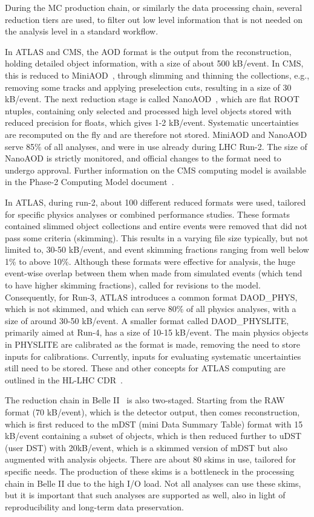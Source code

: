 \documentclass[a4paper,11pt]{article}
\begin{document}
During the MC production chain, or similarly the data processing chain,
several reduction tiers are used, to filter out low level information
that is not needed on the analysis level in a standard workflow.

In ATLAS and CMS, the AOD format is the output from the reconstruction,
holding detailed object information, with a size of about 500 kB/event.
In CMS, this is reduced to MiniAOD~\cite{Petrucciani_2015}, through
slimming and thinning the collections, e.g., removing some tracks and
applying preselection cuts, resulting in a size of 30 kB/event. The next
reduction stage is called NanoAOD~\cite{Peruzzi_2020},
which are flat ROOT ntuples, containing only selected and processed high
level objects stored with reduced precision for floats, which gives 1-2
kB/event. Systematic uncertainties are recomputed on the fly and are
therefore not stored. MiniAOD and NanoAOD serve 85\% of all analyses,
and were in use already during LHC Run-2. The size of NanoAOD is
strictly monitored, and official changes to the format need to undergo
approval. Further information on the CMS computing model is available in
the Phase-2 Computing Model document~\cite{Software:2815292}.

In ATLAS, during run-2, about 100 different reduced formats were used,
tailored for specific physics analyses or combined performance studies.
These formats contained slimmed object collections and entire events
were removed that did not pass some criteria (skimming). This results in
a varying file size typically, but not limited to, 30-50 kB/event, and
event skimming fractions ranging from well below 1\% to above 10\%.
Although these formats were effective for analysis, the huge event-wise
overlap between them when made from simulated events (which tend to have
higher skimming fractions), called for revisions to the model.
Consequently, for Run-3, ATLAS introduces a common format DAOD\_PHYS,
which is not skimmed, and which can serve 80\% of all physics analyses,
with a size of around 30-50 kB/event. A smaller format called
DAOD\_PHYSLITE, primarily aimed at Run-4, has a size of 10-15 kB/event.
The main physics objects in PHYSLITE are calibrated as the format is
made, removing the need to store inputs for calibrations. Currently,
inputs for evaluating systematic uncertainties still need to be stored.
These and other concepts for ATLAS computing are outlined in the HL-LHC CDR~\cite{Calafiura:2729668}.

The reduction chain in Belle II~\cite{belle2computing} is also two-staged. Starting from the RAW format (70 kB/event),
which is the detector output, then comes reconstruction, which is first
reduced to the mDST (mini Data Summary Table) format with 15 kB/event
containing a subset of objects, which is then reduced further to uDST
(user DST) with 20kB/event, which is a skimmed version of mDST but also
augmented with analysis objects. There are about 80 skims in use,
tailored for specific needs. The production of these skims is a
bottleneck in the processing chain in Belle II due to the high I/O load.
Not all analyses can use these skims, but it is important that such
analyses are supported as well, also in light of reproducibility and
long-term data preservation.
\end{document}
